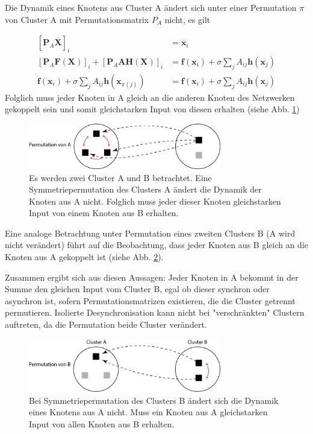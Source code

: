 Die Dynamik eines Knotens aus Cluster A ändert sich unter einer Permutation $\pi$ von Cluster A mit Permutationsmatrix $P_A$ nicht, es gilt



\begin{align}
		\left[\boldsymbol{P}_A	\overset{\cdot}{\boldsymbol{X}}\right]_i&=
		\overset{\cdot}{\boldsymbol{x}}_i\\
		\left[\boldsymbol{P}_A \boldsymbol{F}(\boldsymbol{X})\right]_i+
			\left[\boldsymbol{P}_A\boldsymbol{A}\boldsymbol{H}(\boldsymbol{X})\right]_i&=
					\boldsymbol{f}(\boldsymbol{x}_i)+
						\sigma\sum_j
					A_{ij}\boldsymbol{h}(\boldsymbol{x}_j)\\
		\boldsymbol{f}(\boldsymbol{x}_i)+
			\sigma\sum_j A_{ij}\boldsymbol{h}(\boldsymbol{x}_{\pi\left(j\right)})&=
		\boldsymbol{f}(\boldsymbol{x}_i)+
			\sigma\sum_j
		A_{ij}\boldsymbol{h}(\boldsymbol{x}_j)		
\end{align}
Folglich muss jeder Knoten in A gleich an die anderen Knoten des Netzwerken gekoppelt sein und somit gleichstarken Input von diesen erhalten (siehe Abb. \ref{fig:perma})

\begin{figure}
\label{fig:perma}
		\includegraphics[width=0.75\textwidth]{abb/misc/perm_a.png}
		\caption{Es werden zwei Cluster A und B betrachtet. Eine Symmetriepermutation des Clusters A ändert die Dynamik der Knoten aus A nicht. Folglich muss jeder dieser Knoten gleichstarken Input von einem Knoten aus B erhalten.}
\end{figure}


Eine analoge Betrachtung  unter Permutation eines zweiten Clusters B (A wird nicht verändert) führt auf die Beobachtung, dass jeder Knoten aus B gleich an die Knoten aus A gekoppelt ist (siehe Abb. \ref{fig:permb}). 

Zusammen ergibt sich aus diesen Aussagen: Jeder Knoten in A bekommt in der Summe den gleichen Input vom Cluster B, egal ob dieser synchron oder asynchron ist, sofern Permutationsmatrizen existieren, die die Cluster getrennt permutieren. Isolierte Desynchronisation kann nicht bei "verschränkten" Clustern auftreten, da die Permutation beide Cluster verändert.

	\begin{figure}
	\label{fig:permb}
		\includegraphics[width=0.75\textwidth]{abb/misc/perm_b.png}
		\caption{Bei Symmetriepermutation des Clusters B ändert sich die Dynamik eines Knotens aus A nicht. Muss ein Knoten aus A gleichstarken Input von allen Knoten aus B erhalten.}
	\end{figure}
	

